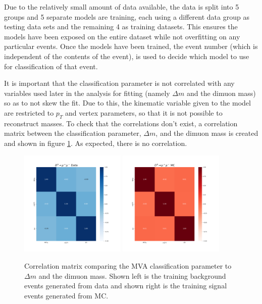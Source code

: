 Due to the relatively small amount of data available, the data is split into 5 groups and 5 separate models are training, each using a different data group as testing data sets and the remaining 4 as training datasets. This ensures the models have been exposed on the entire dataset while not overfitting on any particular events. Once the models have been trained, the event number (which is independent of the contents of the event), is used to decide which model to use for classification of that event. 

It is important that the classification parameter is not correlated with any variables used later in the analysis for fitting (namely $\Delta m$ and the dimuon mass) so as to not skew the fit. Due to this, the kinematic variable given to the model are restricted to $p_T$ and vertex parameters, so that it is not possible to reconstruct masses. To check that the correlations don't exist, a correlation matrix between the classification parameter, $\Delta m$, and the dimuon mass is created and shown in figure \ref{fig:mva_correlation_matrix_for_fit_variables}. As expected, there is no correlation.


\begin{figure}[htp]
    \begin{center}
      \includegraphics[width=0.45\textwidth]{figures/chapter4/mva/Correlation_data_obs.png}
      \includegraphics[width=0.45\textwidth]{figures/chapter4/mva/Correlation_dmm_obs.png}\\
    \end{center}
    \caption{
      Correlation matrix comparing the MVA classification parameter to $\Delta m$ and the dimuon mass. Shown left is the training background events generated from data and shown right is the training signal events generated from MC.
    }
    \label{fig:mva_correlation_matrix_for_fit_variables}
\end{figure}



